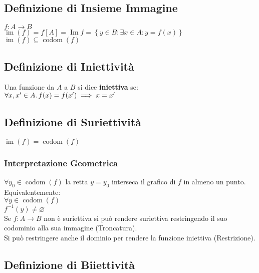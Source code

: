 \documentclass[a4paper, twoside, italian, 11pt]{book}
\newcommand{\braces}[1] {\left \{ #1 \right \}}
\DeclareMathOperator{\codom}{codom}
\DeclareMathOperator{\Ima}{Im}
\DeclareMathOperator{\im}{im}
\let\emptyset\varnothing
\begin{document}
\subsection{Definizione di Insieme Immagine}

\noindent
$f : A \rightarrow B$ \\
$\im(f) = f[A] = \Ima f= \braces{y \in B : \exists x \in A : y = f(x)}$ \\

\noindent
$\im(f) \subseteq \codom(f)$


\subsection{Definizione di Iniettività}

\noindent
Una funzione da $A$ a $B$ si dice \textbf{iniettiva} se: \\

$\forall x, x' \in A \ldotp f(x) = f(x') \implies x = x'$


\subsection{Definizione di Suriettività}

\noindent
$\im(f) = \codom(f)$


\subsubsection{Interpretazione Geometrica}

\noindent
$\forall y_0 \in \codom(f)$ la retta $y = y_0$ interseca il grafico di $f$ in almeno un punto. \\

\noindent
Equivalentemente: \\
\indent
$\forall y \in \codom(f)$ \\
\indent
$f^{-1}({y}) \neq \emptyset$ \\

\noindent
Se $f : A \rightarrow B$ non è suriettiva si può rendere suriettiva restringendo il suo codominio alla sua immagine (Troncatura). \\

\noindent
Si può restringere anche il dominio per rendere la funzione iniettiva (Restrizione). %


\subsection{Definizione di Biiettività}
\end{document}
